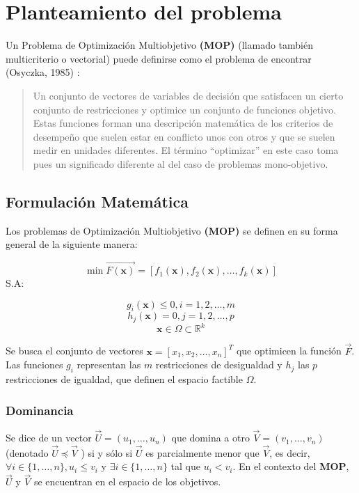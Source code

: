 \documentclass[letterpaper,10pt]{article}
\begin{document}
 
\section{Planteamiento del problema}

Un Problema de Optimización Multiobjetivo \textbf{(MOP)} (llamado también
multicriterio o vectorial) puede definirse como el problema de
encontrar (Osyczka, 1985) \cite{Osyczka1985193}:
\begin{quote}
Un conjunto de vectores de variables de decisión que satisfacen un cierto
conjunto de restricciones y optimice un conjunto de funciones
objetivo. Estas funciones forman una descripción matemática
de los criterios de desempeño que suelen estar en conflicto
unos con otros y que se suelen medir en unidades diferentes.
El término ``optimizar'' en este caso toma pues un significado
diferente al del caso de problemas mono-objetivo.
\end{quote}



\subsection{Formulación Matemática}
Los problemas de Optimización Multiobjetivo \textbf{(MOP)} se definen en su forma general de la siguiente manera:
 
$$\min \overrightarrow{F(\bm{x})} = \left[ f_1(\bm{x}), f_2(\bm{x}) , \dots, f_k(\bm{x}) \right] $$
S.A:
 
$$g_i(\bm{x}) \leq 0, i=1,2,\dots,m$$
$$h_j(\bm{x}) = 0, j=1,2,\dots,p$$
$$\bm{x} \in \Omega \subset \mathbb{R}^k$$

Se busca el conjunto de vectores $\bm{x}=[x_1,x_2,\dots,x_n]^T$ que optimicen la función $\overrightarrow{F}$. Las funciones $g_i$ representan las $m$ restricciones de desigualdad y $h_j$ las $p$ restricciones de igualdad, que definen el espacio factible $\Omega$.

\subsubsection{Dominancia}

Se dice de un vector $\overrightarrow{U}= (u_1 ,\dots, u_n )$ que domina a otro $\overrightarrow{V}= (v_1 ,\dots, v_n )$ (denotado $\overrightarrow{U} \preceq \overrightarrow{V}$ ) si y sólo si $\overrightarrow{U}$ es parcialmente menor que $\overrightarrow{V}$, es decir,
$\forall i \in \{1,\dots, n\}, u_i \leq v_i$ y $\exists i \in \{1,\dots, n \} $ tal que  $u_i<v_i$.
\newline
En el contexto del \textbf{MOP},  $\overrightarrow{U}$ y $\overrightarrow{V}$ se encuentran en el espacio de los objetivos.
 
\end{document}
